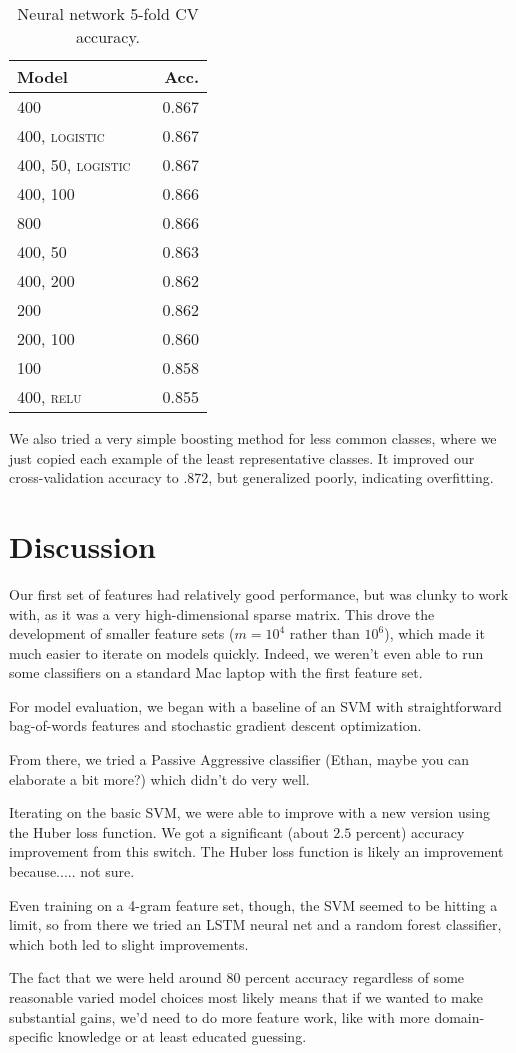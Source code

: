 \documentclass[11pt]{article}
\begin{document}
\begin{table}[h]
	\centering
	\begin{tabular}{llr}
		\toprule
		Model &  & Acc. \\
		\midrule
		\textsc{400} & & 0.867 \\
		\textsc{400, logistic} & & 0.867 \\
		\textsc{400, 50, logistic} & & 0.867  \\
		\textsc{400, 100} & & 0.866 \\
		\textsc{800} & & 0.866 \\
		\textsc{400, 50} & & 0.863  \\
		\textsc{400, 200} & & 0.862 \\
		\textsc{200} & & 0.862 \\
		\textsc{200, 100} & & 0.860 \\
		\textsc{100} & & 0.858 \\
		\textsc{400, relu} & & 0.855 \\
		\bottomrule
	\end{tabular}
	\caption{Neural network 5-fold CV accuracy.}
\end{table}

We also tried a very simple boosting method for less common classes, where we just copied each example of the least representative classes. It improved our cross-validation accuracy to $.872$, but generalized poorly, indicating overfitting.


\section{Discussion} 

Our first set of features had relatively good performance, but was clunky to work with, as it was a very high-dimensional sparse matrix. This drove the development of smaller feature sets ($m = 10^4$ rather than $10^6$), which made it much easier to iterate on models quickly. Indeed, we weren't even able to run some classifiers on a standard Mac laptop with the first feature set.

For model evaluation, we began with a baseline of an SVM with straightforward bag-of-words features and stochastic gradient descent optimization.

From there, we tried a Passive Aggressive classifier (Ethan, maybe you can elaborate a bit more?) which didn't do very well.

Iterating on the basic SVM, we were able to improve with a new version using the Huber loss function. We got a significant (about $2.5$ percent) accuracy improvement from this switch. The Huber loss function is likely an improvement because..... not sure.

Even training on a 4-gram feature set, though, the SVM seemed to be hitting a limit, so from there we tried an LSTM neural net and a random forest classifier, which both led to slight improvements.

The fact that we were held around $80$ percent accuracy regardless of some reasonable varied model choices most likely means that if we wanted to make substantial gains, we'd need to do more feature work, like with more domain-specific knowledge or at least educated guessing. 
\end{document}
